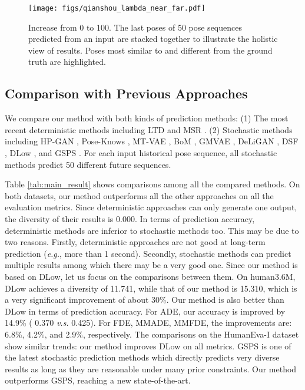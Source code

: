 \documentclass[sigconf,screen,nonacm]{acmart}
\begin{document}
	


	\begin{figure*}[!t]
		\centering
		\texttt{[image: figs/qianshou\_lambda\_near\_far.pdf]}
		\caption{Increase  from 0 to 100. The last poses of 50 pose sequences predicted from an input are stacked together to illustrate the holistic view of results. Poses most similar to and different from the ground truth are highlighted.}
		\label{fig:qian_shou_guan_yin}
	\end{figure*}
	
	\subsection{Comparison with Previous Approaches}
	
	We compare our method with both kinds of prediction methods: 
(1) The most recent deterministic methods including LTD \cite{mao2019learning} and MSR \cite{dang2021msr}. 
	(2) Stochastic methods including HP-GAN \cite{barsoum2018hp}, Pose-Knows \cite{walker2017pose}, MT-VAE \cite{yan2018mt}, BoM \cite{bhattacharyya2018accurate}, GMVAE \cite{dilokthanakul2016deep}, DeLiGAN \cite{gurumurthy2017deligan}, DSF \cite{yuan2019diverse}, DLow \cite{yuan2020dlow}, and GSPS \cite{mao2021generating}. For each input historical pose sequence, all stochastic methods predict 50 different future sequences.
	
	Table \ref{tab:main_result} shows comparisons among all the compared methods. On both datasets, our method outperforms all the other approaches on all the evaluation metrics. Since deterministic approaches can only generate one output, the diversity of their results is 0.000. In terms of prediction accuracy, deterministic methods are inferior to stochastic methods too. This may be due to two reasons. Firstly, deterministic approaches are not good at long-term prediction (\textit{e.g.}, more than 1 second). Secondly, stochastic methods can predict multiple results among which there may be a very good one. 
	Since our method is based on DLow, let us focus on the comparisons between them. On human3.6M, DLow achieves a diversity of 11.741, while that of our method is 15.310, which is a very significant improvement of about 30\%. Our method is also better than DLow in terms of prediction accuracy. For ADE, our accuracy is improved by 14.9\% ( 0.370 \textit{v.s.} 0.425). For FDE, MMADE, MMFDE, the improvements are: 6.8\%, 4.2\%, and 2.9\%, respectively. The comparisons on the HumanEva-I dataset show similar trends: our method improves DLow on all metrics. GSPS is one of the latest stochastic prediction methods which directly predicts very diverse results as long as they are reasonable under many prior constraints. Our method outperforms GSPS, reaching a new state-of-the-art.
\end{document}
